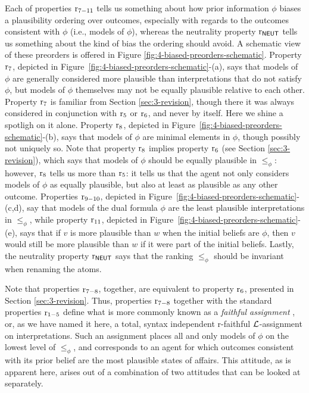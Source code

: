 Each of properties $\mathrm{r}_{7-11}$ tells us something about how prior information $\phi$ 
biases a plausibility ordering over outcomes, especially with regards to the outcomes consistent with $\phi$ 
(i.e., models of $\phi$),
whereas the neutrality property $\mathrm{r}_{\mathsf{NEUT}}$ 
tells us something about the kind of bias the ordering should avoid.
A schematic view of these preorders is offered in 
Figure \ref{fig:4-biased-preorders-schematic}.
Property $\mathrm{r}_{7}$, depicted in Figure~\ref{fig:4-biased-preorders-schematic}-(a), 
says that models of $\phi$ are generally considered
more plausible than interpretations that do not satisfy $\phi$,
but models of $\phi$ themselves may not be equally plausible relative to each other.
Property $\mathrm{r}_{7}$ is familiar from Section \ref{sec:3-revision}, though 
there it was always considered in conjunction with
$\mathrm{r}_{5}$ or $\mathrm{r}_{6}$, and never by itself. Here we shine a spotligh on it alone.
Property $\mathrm{r}_{8}$, depicted in Figure~\ref{fig:4-biased-preorders-schematic}-(b), says that
models of $\phi$ are minimal elements in $\phi$, 
though possibly not uniquely so.
Note that property $\mathrm{r}_{8}$ implies property $\mathrm{r}_{6}$ (see Section \ref{sec:3-revision}),
which says that models of $\phi$ should be equally plausible in $\le_\phi$:
however, $\mathrm{r}_{8}$ tells us more than $\mathrm{r}_{5}$:
it tells us that the agent not only considers models of $\phi$ as equally plausible,
but also at least as plausible as any other outcome.
Properties $\mathrm{r}_{9-10}$, depicted in Figure~\ref{fig:4-biased-preorders-schematic}-(c,d),
say that models of the dual formula $\phi$ are the least plausible interpretations in $\le_\phi$,
while property $\mathrm{r}_{11}$, depicted in Figure~\ref{fig:4-biased-preorders-schematic}-(e),
says that if $v$ is more plausible than $w$ when
the initial beliefs are $\phi$, then $v$ would still be more plausible 
than $w$ if it were part of the initial beliefs.
Lastly, the neutrality property $\mathrm{r}_{\mathsf{NEUT}}$ says that the ranking $\le_\phi$ should be invariant
when renaming the atoms.

Note that properties $\mathrm{r}_{7-8}$, together,
are equivalent to property $\mathrm{r}_{6}$, presented in Section \ref{sec:3-revision}.
Thus, properties $\mathrm{r}_{7-8}$
together with the standard properties 
$\mathrm{r}_{1-5}$ define what is more commonly known as 
a \emph{faithful assignment} \cite{KatsunoM92},
or, as we have named it here,
a total, syntax independent r-faithful $\mathcal{L}$-assignment on interpretations.
Such an assignment
places all and only models of $\phi$ on the lowest level of $\le_\phi$,
and corresponds to an agent for which outcomes 
consistent with its prior belief are the most plausible states of affairs.
This attitude, as is apparent here, 
arises out of a combination of two attitudes that can be looked at separately.

